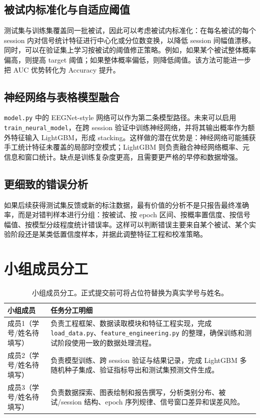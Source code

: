 \section{被试内标准化与自适应阈值}

测试集与训练集覆盖同一批被试，因此可以考虑被试内标准化：在每名被试的每个 session 内对信号统计特征进行中心化或分位数变换，以降低 session 间幅值漂移。同时，可以在验证集上学习按被试的阈值修正策略。例如，如果某个被试整体概率偏高，则提高 target 阈值；如果整体概率偏低，则降低阈值。该方法可能进一步把 AUC 优势转化为 Accuracy 提升。

\section{神经网络与表格模型融合}

\texttt{model.py} 中的 EEGNet-style 网络可以作为第二条模型路径。未来可以启用 \texttt{train\_neural\_model}，在跨 session 验证中训练神经网络，并将其输出概率作为额外特征输入 LightGBM，形成 stacking。这样做的潜在优势是：神经网络可能捕获手工统计特征未覆盖的局部时空模式；LightGBM 则负责融合神经网络概率、元信息和窗口统计。缺点是训练复杂度更高，且需要更严格的早停和数据增强。

\section{更细致的错误分析}

如果后续获得测试集反馈或新的标注数据，最有价值的分析不是只报告最终准确率，而是对错判样本进行分组：按被试、按 epoch 区间、按概率置信度、按信号幅值、按模型分歧程度统计错误率。这样可以判断错误主要来自某个被试、某个实验阶段还是某类低置信度样本，并据此调整特征工程和校准策略。

\chapter{小组成员分工}

\begin{table}[htbp]
\centering
\small
\begin{tabular}{lp{9cm}}
\hline
小组成员 & 任务分工明细 \\
\hline
成员1（学号/姓名待填写） & 负责工程框架、数据读取模块和特征工程实现，完成 \texttt{load\_data.py}、\texttt{feature\_engineering.py} 的整理，确保训练和测试阶段使用一致的数据处理流程。\\
成员2（学号/姓名待填写） & 负责模型训练、跨 session 验证与结果记录，完成 LightGBM 多随机种子集成、验证指标导出和测试集预测文件生成。\\
成员3（学号/姓名待填写） & 负责数据探索、图表绘制和报告撰写，分析类别分布、被试/session 结构、epoch 序列规律、信号窗口差异和误差风险。\\
\hline
\end{tabular}
\caption{小组成员分工。正式提交前可将占位符替换为真实学号与姓名。}
\end{table}

